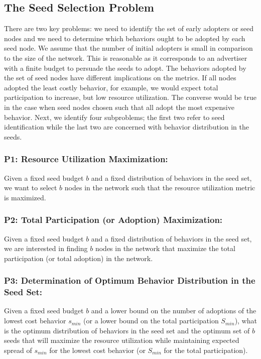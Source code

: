 \documentclass[letterpaper]{article}
\theoremstyle{plain} 		\newtheorem{thm}{Theorem}[section]
\theoremstyle{definition} 	\newtheorem{defn}[thm]{Definition}
\theoremstyle{remark}		\newtheorem{rem}{Remark}
\begin{document}
\subsection{The Seed Selection Problem}
There are two key problems: we need to identify the set of early adopters or seed nodes and we need to determine which behaviors ought to be adopted by each seed node. We assume that the number of initial adopters is small in comparison to the size of the network. This is reasonable as it corresponds to an advertiser with a finite budget to persuade the seeds to adopt. The behaviors adopted by the set of seed nodes have different implications on the metrics. If all nodes adopted the least costly behavior, for example, we would expect total participation to increase, but low resource utilization. The converse would be true in the case when seed nodes chosen such that all adopt the most expensive behavior. Next, we identify four subproblems; the first two refer to seed identification while the last two are concerned with behavior distribution in the seeds.

\subsubsection{P1: Resource Utilization Maximization:} Given a fixed seed budget $b$ and a fixed distribution of behaviors in the seed set, we want to select $b$ nodes in the network such that the resource utilization metric is maximized.

\subsubsection{P2: Total Participation (or Adoption) Maximization:} Given a fixed seed budget $b$ and a fixed distribution of behaviors in the seed set, we are interested in finding $b$ nodes in the network that maximize the total participation (or total adoption) in the network.

\subsubsection{P3: Determination of Optimum Behavior Distribution in the Seed Set:} Given a fixed seed budget $b$ and a lower bound on the number of adoptions of the lowest cost behavior $s_{min}$ (or a lower bound on the total participation $S_{min}$), what is the optimum distribution of behaviors in the seed set and the optimum set of $b$ seeds that will maximize the resource utilization while maintaining expected spread of $s_{min}$ for the lowest cost behavior (or $S_{min}$ for the total participation).
\end{document}
